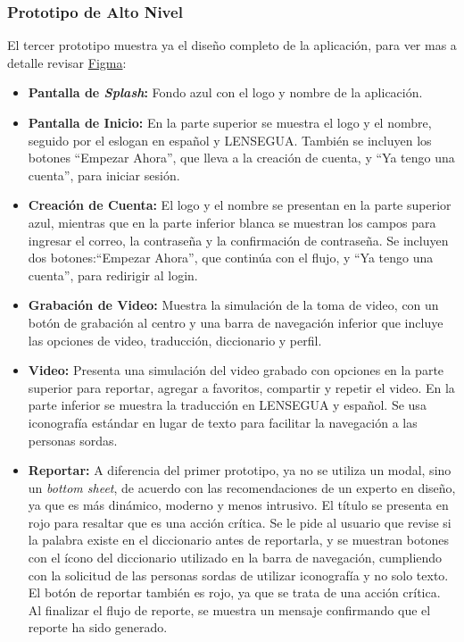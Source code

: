 \subsubsection{Prototipo de Alto Nivel}

El tercer prototipo muestra ya el diseño completo de la aplicación, para ver mas a detalle revisar \href{https://www.figma.com/design/d7NOw36r1mUY7qDBIveJ2K/Se%C3%B1as-Chapinas?node-id=322-1684&node-type=CANVAS&t=ua1wEji5yxVRI6ES-0}{Figma}:

\begin{itemize}
    \item \textbf{Pantalla de \textit{Splash}:} Fondo azul con el logo y nombre de la aplicación.
  
    \item \textbf{Pantalla de Inicio:} En la parte superior se muestra el logo y el nombre, seguido por el eslogan en español y LENSEGUA. También se incluyen los botones ``Empezar Ahora'', que lleva a la creación de cuenta, y ``Ya tengo una cuenta'', para iniciar sesión.
  
    \item \textbf{Creación de Cuenta:} El logo y el nombre se presentan en la parte superior azul, mientras que en la parte inferior blanca se muestran los campos para ingresar el correo, la contraseña y la confirmación de contraseña. Se incluyen dos botones:``Empezar Ahora'', que continúa con el flujo, y ``Ya tengo una cuenta'', para redirigir al login.
  
    \item \textbf{Grabación de Video:} Muestra la simulación de la toma de video, con un botón de grabación al centro y una barra de navegación inferior que incluye las opciones de video, traducción, diccionario y perfil.

    \item \textbf{Video:} Presenta una simulación del video grabado con opciones en la parte superior para reportar, agregar a favoritos, compartir y repetir el video. En la parte inferior se muestra la traducción en LENSEGUA y español. Se usa iconografía estándar en lugar de texto para facilitar la navegación a las personas sordas.

    \item \textbf{Reportar:} A diferencia del primer prototipo, ya no se utiliza un modal, sino un \textit{bottom sheet}, de acuerdo con las recomendaciones de un experto en diseño, ya que es más dinámico, moderno y menos intrusivo. El título se presenta en rojo para resaltar que es una acción crítica. Se le pide al usuario que revise si la palabra existe en el diccionario antes de reportarla, y se muestran botones con el ícono del diccionario utilizado en la barra de navegación, cumpliendo con la solicitud de las personas sordas de utilizar iconografía y no solo texto. El botón de reportar también es rojo, ya que se trata de una acción crítica. Al finalizar el flujo de reporte, se muestra un mensaje confirmando que el reporte ha sido generado.


\end{itemize}
